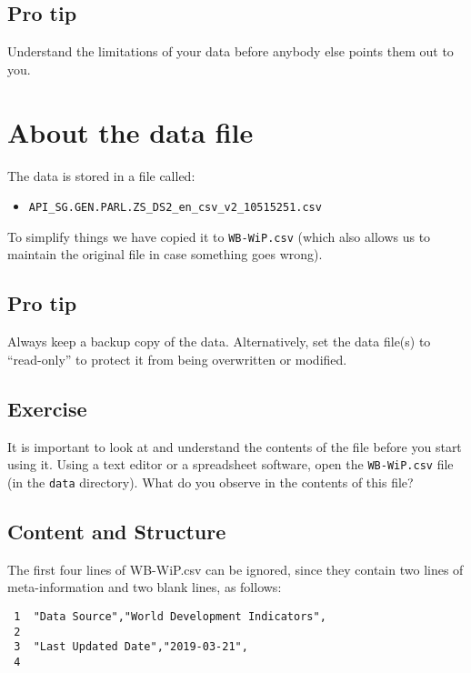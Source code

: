 \documentclass[a4paper,9pt,twocolumn,twoside,printwatermark=false]{pinp}
\providecommand{\tightlist}{%
  \setlength{\itemsep}{0pt}\setlength{\parskip}{0pt}}
\begin{document}
\subsection{Pro tip}\label{pro-tip}

Understand the limitations of your data before anybody else points them
out to you.

\section{About the data file}\label{about-the-data-file}

The data is stored in a file called:

\begin{itemize}
\tightlist
\item
  \texttt{API\_SG.GEN.PARL.ZS\_DS2\_en\_csv\_v2\_10515251.csv}
\end{itemize}

To simplify things we have copied it to \texttt{WB-WiP.csv} (which also
allows us to maintain the original file in case something goes wrong).

\subsection{Pro tip}\label{pro-tip-1}

Always keep a backup copy of the data. Alternatively, set the data
file(s) to ``read-only'' to protect it from being overwritten or
modified.

\subsection{Exercise}\label{exercise}

It is important to look at and understand the contents of the file
before you start using it. Using a text editor or a spreadsheet
software, open the \texttt{WB-WiP.csv} file (in the \texttt{data}
directory). What do you observe in the contents of this file?

\subsection{Content and Structure}\label{content-and-structure}

The first four lines of WB-WiP.csv can be ignored, since they contain
two lines of meta-information and two blank lines, as follows:

\begin{verbatim}
 1  ﻿"Data Source","World Development Indicators",
 2  
 3  "Last Updated Date","2019-03-21",
 4  
\end{verbatim}
\end{document}
